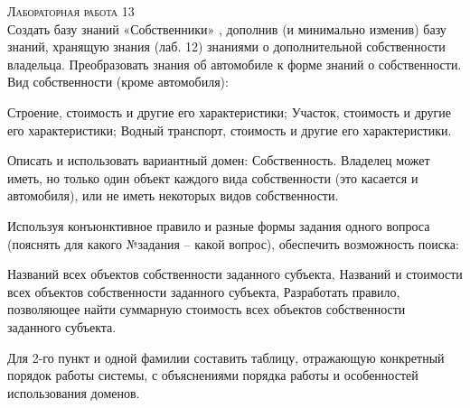 \textsc{\huge Лабораторная работа 13} \\
Создать базу знаний «Собственники» , дополнив (и минимально изменив) базу
знаний, хранящую знания (лаб. 12) знаниями о дополнительной собственности владельца. Преобразовать знания об автомобиле к форме знаний о собственности.
Вид собственности (кроме автомобиля):
\begin{tasks}[label=\arabic*]
	\task Строение, стоимость и другие его характеристики;
	\task Участок, стоимость и другие его характеристики;
	\task Водный транспорт, стоимость и другие его характеристики.
\end{tasks}
Описать и использовать вариантный домен: Собственность. Владелец может иметь,
но только один объект каждого вида собственности (это касается и автомобиля), или не иметь некоторых видов собственности.

Используя конъюнктивное правило и
разные формы задания одного вопроса (пояснять для какого №задания – какой вопрос),
обеспечить возможность поиска:
\begin{tasks}[label=\arabic*]
	\task Названий всех объектов собственности заданного субъекта,
	\task Названий и стоимости всех объектов собственности заданного субъекта,
	\task * Разработать правило, позволяющее найти суммарную стоимость всех
	объектов собственности заданного субъекта.
\end{tasks}
Для 2-го пункт и одной фамилии составить таблицу, отражающую конкретный
порядок работы системы, с объяснениями порядка работы и особенностей использования
доменов.

